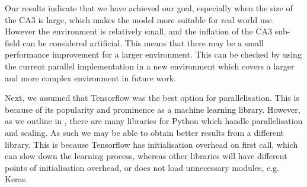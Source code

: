 {
}
{
Our results indicate that we have achieved our goal, especially when the size of the CA3 is large, which makes the model more suitable for real world use. 
However the environment is relatively small, and the inflation of the CA3 sub-field can be considered artificial.
This means that there may be a small performance improvement for a larger environment.
This can be checked by using the current parallel implementation in a new environment which covers a larger and more complex environment in future work.
}

{
}

{
Next, we assumed that Tensorflow was the best option for parallelisation.
This is because of its popularity and prominence as a machine learning library.
However, as we outline in , there are many libraries for Python which handle parallelisation and scaling.
As such we may be able to obtain better results from a different library.
This is because Tensorflow has initialisation overhead on first call, which can slow down the learning process, whereas other libraries will have different points of initialisation overhead, or does not load unnecessary modules, e.g. Keras. 
}

{
}

